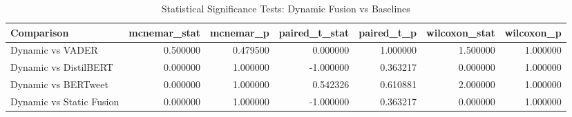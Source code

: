 \begin{table}[h!]
\centering
\caption{Statistical Significance Tests: Dynamic Fusion vs Baselines}
\label{tab:significance}
\small
\begin{tabular}{lrrrrrr}
\toprule
Comparison & mcnemar_stat & mcnemar_p & paired_t_stat & paired_t_p & wilcoxon_stat & wilcoxon_p \\
\midrule
Dynamic vs VADER & 0.500000 & 0.479500 & 0.000000 & 1.000000 & 1.500000 & 1.000000 \\
Dynamic vs DistilBERT & 0.000000 & 1.000000 & -1.000000 & 0.363217 & 0.000000 & 1.000000 \\
Dynamic vs BERTweet & 0.000000 & 1.000000 & 0.542326 & 0.610881 & 2.000000 & 1.000000 \\
Dynamic vs Static Fusion & 0.000000 & 1.000000 & -1.000000 & 0.363217 & 0.000000 & 1.000000 \\
\bottomrule
\end{tabular}

\end{table}